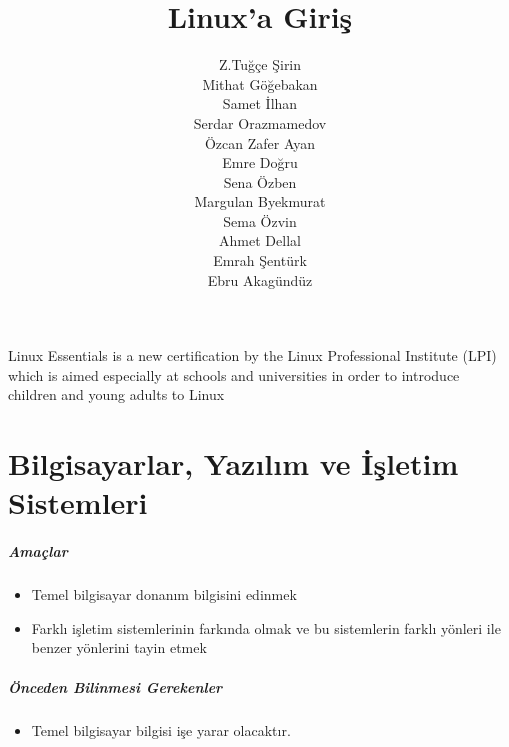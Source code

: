 \documentclass[10pt,a5paper]{book}
\begin{document}
\title{Linux'a Giriş}
\author{Z.Tuğçe Şirin\\
Mithat Göğebakan\\
Samet İlhan\\
Serdar Orazmamedov\\
Özcan Zafer Ayan\\
Emre Doğru\\
Sena Özben\\
Margulan Byekmurat\\
Sema Özvin\\
Ahmet Dellal\\
Emrah Şentürk\\
Ebru Akagündüz}
\renewcommand{\today}{December 13, 2012}
\renewcommand*\chaptername{Bölüm}
\maketitle
Linux Essentials is a new certification by the Linux Professional Institute (LPI) which is aimed especially at schools and universities in order to introduce children and young adults to Linux
\renewcommand*\contentsname{İçindekiler}
\tableofcontents
\listoftables
\chapter{Bilgisayarlar, Yazılım ve İşletim Sistemleri}
\paragraph{Amaçlar}
\begin{itemize}
 \item Temel bilgisayar donanım bilgisini edinmek
 \item Farklı işletim sistemlerinin farkında olmak ve bu sistemlerin farklı yönleri ile benzer yönlerini tayin etmek
 \end{itemize}
 
\paragraph{Önceden Bilinmesi Gerekenler}
\begin{itemize}
 \item Temel bilgisayar bilgisi işe yarar olacaktır.
 \end{itemize}
\end{document}
